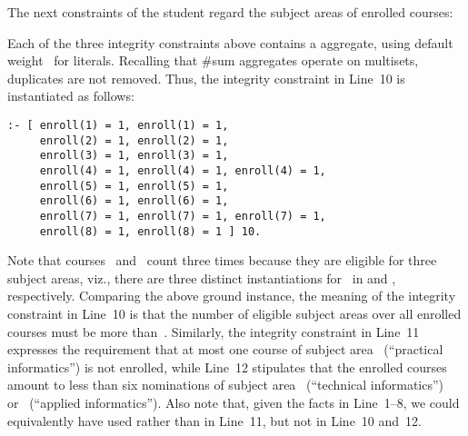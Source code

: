 \begin{example}
The next constraints of the student regard the subject areas of enrolled courses:
%

%
Each of the three integrity constraints above contains a  aggregate,
using default weight~ for literals.
Recalling that \const\#{sum} aggregates operate on multisets,
duplicates are not removed.
Thus, the integrity constraint in Line~10 is instantiated as follows:
%
\begin{lstlisting}[firstnumber=10,stepnumber=10]
:- [ enroll(1) = 1, enroll(1) = 1, 
     enroll(2) = 1, enroll(2) = 1,
     enroll(3) = 1, enroll(3) = 1,
     enroll(4) = 1, enroll(4) = 1, enroll(4) = 1,
     enroll(5) = 1, enroll(5) = 1,
     enroll(6) = 1, enroll(6) = 1,
     enroll(7) = 1, enroll(7) = 1, enroll(7) = 1,
     enroll(8) = 1, enroll(8) = 1 ] 10.
\end{lstlisting}
%
Note that courses~ and~ count three times because
they are eligible for three subject areas, viz., there are three
distinct instantiations for~ in
 and
, respectively.
Comparing the above ground instance,
the meaning of the integrity constraint in Line~10 is that the 
number of eligible subject areas over all enrolled courses
must be more than~.
Similarly, the integrity constraint in Line~11 expresses the requirement
that at most one course of subject area~ (``practical informatics'')
is not enrolled,
while Line~12 stipulates that the enrolled courses
amount to less than six nominations of
subject area~ (``technical informatics'') 
or~ (``applied informatics'').
Also note that, given the facts in Line~1--8,
we could equivalently have used  rather than  in Line~11,
but not in Line~10 and~12.


\end{example}
